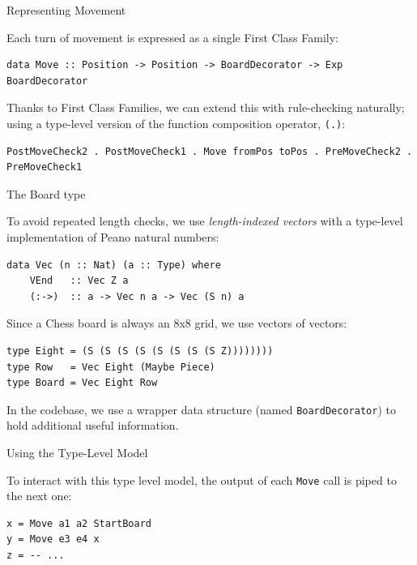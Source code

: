 \documentclass{beamer}
\newcommand{\inline}[1]{\lstinline[basicstyle=\ttfamily]{#1}}
\begin{document}
\begin{frame}[fragile]{Representing Movement}


Each turn of movement is expressed as a single First Class Family:

\begin{lstlisting}
data Move :: Position -> Position -> BoardDecorator -> Exp BoardDecorator
\end{lstlisting}

\pause

Thanks to First Class Families, we can extend this with rule-checking naturally; using a type-level version of the function composition operator, \inline{(.)}:

\begin{lstlisting}
PostMoveCheck2 . PostMoveCheck1 . Move fromPos toPos . PreMoveCheck2 . PreMoveCheck1
\end{lstlisting}

\end{frame}

\begin{frame}[fragile]{The Board type}

To avoid repeated length checks, we use \emph{length-indexed vectors} with a type-level implementation of Peano natural numbers:

\begin{lstlisting}
data Vec (n :: Nat) (a :: Type) where
    VEnd   :: Vec Z a
    (:->)  :: a -> Vec n a -> Vec (S n) a
\end{lstlisting}

Since a Chess board is always an 8x8 grid, we use vectors of vectors:

\begin{lstlisting}
type Eight = (S (S (S (S (S (S (S (S Z))))))))
type Row   = Vec Eight (Maybe Piece)
type Board = Vec Eight Row
\end{lstlisting}

In the codebase, we use a wrapper data structure (named \inline{BoardDecorator}) to hold additional useful information.

\end{frame}

\begin{frame}[fragile]{Using the Type-Level Model}

To interact with this type level model, the output of each \inline{Move} call is piped to the next one:

\begin{lstlisting}
x = Move a1 a2 StartBoard
y = Move e3 e4 x
z = -- ...
\end{lstlisting}

\end{frame}
\end{document}
